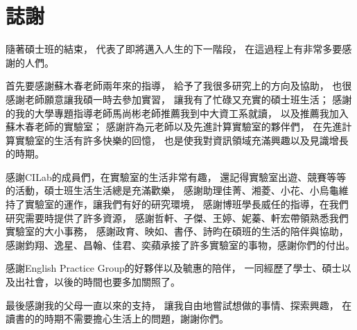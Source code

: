 \documentclass[class=NCU_thesis, crop=false]{standalone}
\begin{document}
\chapter{誌謝}
隨著碩士班的結束，
代表了即將邁入人生的下一階段，
在這過程上有非常多要感謝的人們。

首先要感謝蘇木春老師兩年來的指導，
給予了我很多研究上的方向及協助，
也很感謝老師願意讓我碩一時去參加實習，
讓我有了忙碌又充實的碩士班生活；
感謝的我的大學專題指導老師馬尚彬老師推薦我到中大資工系就讀，
以及推薦我加入蘇木春老師的實驗室；
感謝許為元老師以及先進計算實驗室的夥伴們，
在先進計算實驗室的生活有許多快樂的回憶，
也是使我對資訊領域充滿興趣以及見識增長的時期。

感謝CILab的成員們，在實驗室的生活非常有趣，
還記得實驗室出遊、競賽等等的活動，碩士班生活生活總是充滿歡樂，
感謝助理佳菁、湘菱、小花、小烏龜維持了實驗室的運作，讓我們有好的研究環境，
感謝博班學長威任的指導，在我們研究需要時提供了許多資源，
感謝哲軒、子傑、王婷、妮蓁、軒宏帶領熟悉我們實驗室的大小事務，
感謝政育、映如、書伃、詩昀在碩班的生活的陪伴與協助，
感謝鈞翔、逸星、昌翰、佳君、奕蘋承接了許多實驗室的事物，感謝你們的付出。

感謝English Practice Group的好夥伴以及毓惠的陪伴，
一同經歷了學士、碩士以及出社會，以後的時間也要多加關照了。

最後感謝我的父母一直以來的支持，
讓我自由地嘗試想做的事情、探索興趣，
在讀書的的時期不需要擔心生活上的問題，謝謝你們。
\end{document}
